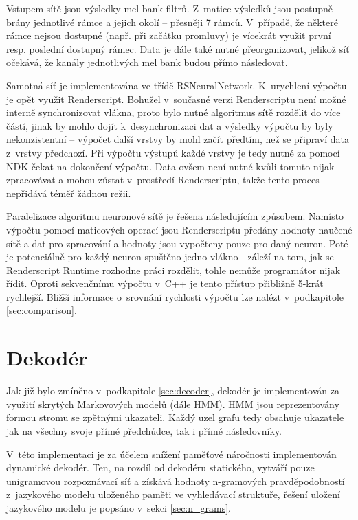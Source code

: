 Vstupem sítě jsou výsledky mel bank filtrů. Z~matice výsledků jsou postupně brány jednotlivé rámce a jejich okolí -- přesněji 7 rámců. V~případě, že některé rámce nejsou dostupné (např. při začátku promluvy) je vícekrát využit první resp. poslední dostupný rámec. Data je dále také nutné přeorganizovat, jelikož síť očekává, že kanály jednotlivých mel bank budou přímo následovat.

Samotná síť je implementována ve třídě RSNeuralNetwork. K~urychlení výpočtu je opět využit Renderscript. Bohužel v~současné verzi Renderscriptu není možné interně synchronizovat vlákna, proto bylo nutné algoritmus sítě rozdělit do více částí, jinak by mohlo dojít k~desynchronizaci dat a výsledky výpočtu by byly nekonzistentní -- výpočet další vrstvy by mohl začít předtím, než se připraví data z~vrstvy předchozí. Při výpočtu výstupů každé vrstvy je tedy nutné za pomocí NDK čekat na dokončení výpočtu. Data ovšem není nutné kvůli tomuto nijak zpracovávat a mohou zůstat v~prostředí Renderscriptu, takže tento proces nepřidává téměř žádnou režii. 

Paralelizace algoritmu neuronové sítě je řešena následujícím způsobem. Namísto výpočtu pomocí maticových operací jsou Renderscriptu předány hodnoty naučené sítě a dat pro zpracování a hodnoty jsou vypočteny pouze pro daný neuron. Poté je potenciálně pro každý neuron spuštěno jedno vlákno - záleží na tom, jak se Renderscript Runtime rozhodne práci rozdělit, tohle nemůže programátor nijak řídit. Oproti sekvenčnímu výpočtu v~C++ je tento přístup přibližně 5-krát rychlejší. Bližší informace o~srovnání rychlosti výpočtu lze nalézt v~podkapitole \ref{sec:comparison}.

\section{Dekodér}\label{sec:imple_dec}
Jak již bylo zmíněno v~podkapitole \ref{sec:decoder}, dekodér je implementován za využití skrytých Markovových modelů (dále HMM). HMM jsou reprezentovány formou stromu se zpětnými ukazateli. Každý uzel grafu tedy obsahuje ukazatele jak na všechny svoje přímé předchůdce, tak i přímé následovníky.

V~této implementaci je za účelem snížení paměťové náročnosti implementován dynamické dekodér. Ten, na rozdíl od dekodéru statického, vytváří pouze unigramovou rozpoznávací síť a získává hodnoty n-gramových pravděpodobností z~jazykového modelu uloženého paměti ve vyhledávací struktuře, řešení uložení jazykového modelu je popsáno v~sekci \ref{sec:n_grams}. 

